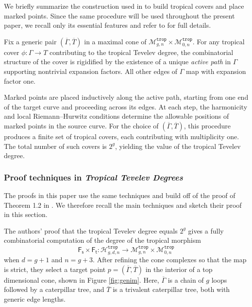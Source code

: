 \documentclass[11pt,reqno]{amsart}
\theoremstyle{definition}
\newcommand\trop{{\mathtt{trop}}}
\newcommand\Mgn[1]{\mathcal M_{#1}}
\newcommand\Hur[1]{\mathcal H_{#1}}
\newcommand{\Ft}{\mathsf{F_t}}
\newcommand{\Fs}{\mathsf{F_s}}
\begin{document}
We briefly summarize the construction used in \cite{troptev} to build tropical covers
and place marked points. Since the same procedure will be used throughout the present
paper, we recall only its essential features and refer to \cite{troptev} for full
details.

Fix a generic pair $(\overline{\Gamma},\overline{T})$ in a maximal cone of
$\Mgn{g,n}^\trop \times \Mgn{0,n}^\trop$. For any tropical cover
$\phi \colon \Gamma \to T$ contributing to the tropical Tevelev degree, the combinatorial
structure of the cover is rigidified by the existence of a unique \emph{active path} in
$\Gamma$ supporting nontrivial expansion factors. All other edges of $\Gamma$ map with
expansion factor one. 

Marked points are placed inductively along the active path, starting from one end of
the target curve and proceeding across its edges. At each step, the harmonicity and
local Riemann--Hurwitz conditions determine the allowable positions of marked points in
the source curve. For the choice of $(\overline{\Gamma},\overline{T})$, this procedure produces a finite
set of tropical covers, each contributing with multiplicity one. The total number of
such covers is $2^g$, yielding the value of the tropical Tevelev degree.


\subsubsection{Proof techniques in \emph{Tropical Tevelev Degrees}}\label{sec:prooftroptev}

The proofs in this paper use the same techniques and build off of the proof of Theorem 1.2 in \cite{troptev}. We therefore recall the main techniques and sketch their proof in this section. 

The authors' proof that the tropical Tevelev degree equals $2^{g}$ gives a fully combinatorial computation of the degree of the tropical morphism
\begin{equation}
    \Fs\times \Ft: \Hur{g,d,n}^\trop \to \Mgn{g,n}^\trop \times \Mgn{0,n}^\trop
\end{equation}
when $d = g+1$ and $n = g+3$. After refining the cone complexes so that the map is strict, they select a target point $p = (\overline{\Gamma}, \overline{T})$ in the interior of a top dimensional cone, shown in Figure \ref{fig:genim}. Here, $\overline{\Gamma}$ is a chain of $g$ loops followed by a caterpillar tree, and $\overline{T}$ is a trivalent caterpillar tree, both with generic edge lengths. 
\end{document}
